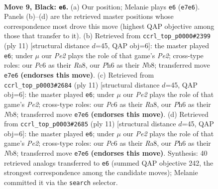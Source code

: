 \documentclass[11pt]{article}
\begin{document}
\clearpage

\begin{figure}[p]\centering
\begin{subfigure}{0.46\textwidth}\centering
\resizebox{\linewidth}{!}{%
\newchessgame
\chessboard[
  setfen={rnq1kb1r/pp2ppp1/2p2nbp/8/1PPP1P1P/6N1/P5P1/R1BQKBNR b KQkq - 0 9},
  showmover=false,
  pgfstyle=straightmove, color=movearrow, markmove={e7-e6}
]}
\caption{}
\end{subfigure}\hfill
\begin{subfigure}{0.46\textwidth}\centering
\resizebox{\linewidth}{!}{%
\newchessgame
\chessboard[
  setfen={rnbqkb1r/1p2pppp/p2p1n2/8/2PNP3/5P2/PP4PP/RNBQKB1R b KQkq - 0 6},
  showmover=false,
  pgfstyle=straightmove, color=movearrow, markmove={e7-e6}
]}
\caption{}
\end{subfigure}
\\[4pt]
\begin{subfigure}{0.46\textwidth}\centering
\resizebox{\linewidth}{!}{%
\newchessgame
\chessboard[
  setfen={rnbqkb1r/1p2pppp/p2p1n2/8/2PNP3/5P2/PP4PP/RNBQKB1R b KQkq - 0 6},
  showmover=false,
  pgfstyle=straightmove, color=movearrow, markmove={e7-e6}
]}
\caption{}
\end{subfigure}\hfill
\begin{subfigure}{0.46\textwidth}\centering
\resizebox{\linewidth}{!}{%
\newchessgame
\chessboard[
  setfen={rnbqkb1r/1p2pppp/p2p1n2/8/2PNP3/5P2/PP4PP/RNBQKB1R b KQkq - 0 6},
  showmover=false,
  pgfstyle=straightmove, color=movearrow, markmove={e7-e6}
]}
\caption{}
\end{subfigure}
\caption{\textbf{Move 9, Black: \texttt{e6}.} (a) Our position; Melanie plays \texttt{e6} (\texttt{e7e6}). Panels (b)--(d) are the retrieved master positions whose correspondence most drove this move (highest QAP objective among those that transfer to it). (b) Retrieved from \texttt{ccrl\_top\_p0000\#2399} (ply 11) [structural distance $d$=45, QAP obj=6]: the master played \texttt{e6}; under $\mu$ our \emph{Pe2} plays the role of that game's \emph{Pe2}; cross-type roles: our \emph{P}c6 as their \emph{R}a8, our \emph{P}h6 as their \emph{N}b8; transferred move \texttt{e7e6} \textbf{(endorses this move)}. (c) Retrieved from \texttt{ccrl\_top\_p0003\#2684} (ply 11) [structural distance $d$=45, QAP obj=6]: the master played \texttt{e6}; under $\mu$ our \emph{Pe2} plays the role of that game's \emph{Pe2}; cross-type roles: our \emph{P}c6 as their \emph{R}a8, our \emph{P}h6 as their \emph{N}b8; transferred move \texttt{e7e6} \textbf{(endorses this move)}. (d) Retrieved from \texttt{ccrl\_top\_p0003\#2685} (ply 11) [structural distance $d$=45, QAP obj=6]: the master played \texttt{e6}; under $\mu$ our \emph{Pe2} plays the role of that game's \emph{Pe2}; cross-type roles: our \emph{P}c6 as their \emph{R}a8, our \emph{P}h6 as their \emph{N}b8; transferred move \texttt{e7e6} \textbf{(endorses this move)}. Synthesis: 40 retrieved analogs transferred to \texttt{e6} (summed QAP objective 242, the strongest correspondence among the candidate moves); Melanie committed it via the \texttt{search} selector.}
\label{fig:thought-m17}
\end{figure}
\end{document}
